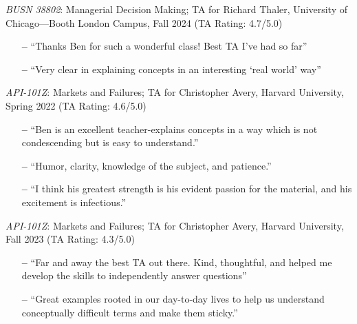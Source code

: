 \documentclass[margin,line,pifont,palatino,courier, 9pt]{res}
\begin{document}
\begin{resume}
\textit{BUSN 38802}: Managerial Decision Making; TA for Richard Thaler, University of Chicago---Booth London Campus, Fall 2024 (TA Rating: 4.7/5.0)
\vspace{2mm}
\begin{itemize}\setlength{\itemsep}{0pt}
    \small
    \item[\textbf{--}] ``Thanks Ben for such a wonderful class! Best TA I've had so far''
    \item[\textbf{--}] ``Very clear in explaining concepts in an interesting `real world' way''
\end{itemize}

\textit{API-101Z}: Markets and Failures; TA for Christopher Avery, Harvard University, Spring 2022 (TA Rating: 4.6/5.0)
\vspace{2mm}
\begin{itemize}\setlength{\itemsep}{0pt}
    \small
    \item[\textbf{--}] ``Ben is an excellent teacher-explains concepts in a way which is not condescending but is easy to understand.''
    \item[\textbf{--}] ``Humor, clarity, knowledge of the subject, and patience.''
    \item[\textbf{--}] ``I think his greatest strength is his evident passion for the material, and his excitement is infectious.''
\end{itemize}

\textit{API-101Z}: Markets and Failures; TA for Christopher Avery, Harvard University, Fall 2023 (TA Rating: 4.3/5.0)
\vspace{2mm}
\begin{itemize}\setlength{\itemsep}{0pt}
    \small
    \item[\textbf{--}] ``Far and away the best TA out there. Kind, thoughtful, and helped me develop the skills to independently answer questions''
    \item[\textbf{--}] ``Great examples rooted in our day-to-day lives to help us understand conceptually difficult terms and make them sticky.''
\end{itemize}





\end{resume}
\end{document}
